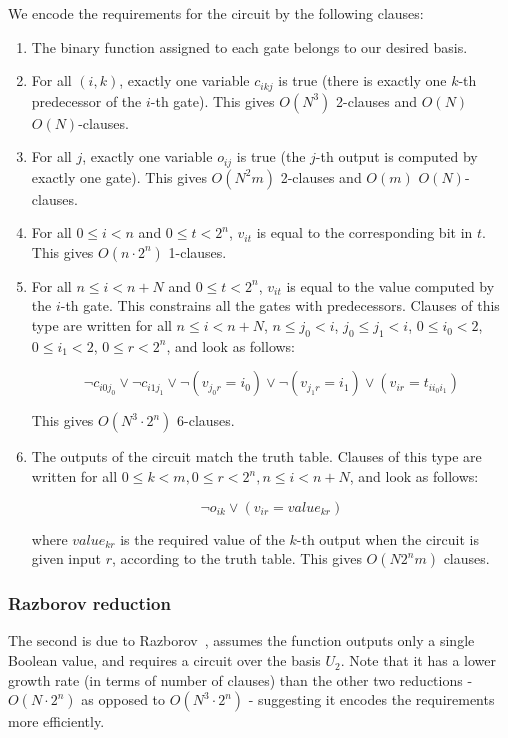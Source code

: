 \documentclass{article}
\begin{document}
We encode the requirements for the circuit by the following clauses:

\begin{enumerate}

  \item The binary function assigned to each gate belongs to our desired basis.
  \item For all $(i,k)$, exactly one variable $c_{ikj}$ is true (there is exactly one $k$-th predecessor of the $i$-th gate). This gives $O(N^3)$ 2-clauses and $O(N)$ $O(N)$-clauses.
  \item For all $j$, exactly one variable $o_{ij}$ is true (the $j$-th output is computed by exactly one gate). This gives $O(N^2m)$ 2-clauses and $O(m)$ $O(N)$-clauses.
  \item For all $0 \leq i < n$ and $0 \leq t < 2^n$, $v_{it}$ is equal to the corresponding bit in $t$. This gives $O(n \cdot 2^n)$ 1-clauses.
  \item For all $n \leq i < n + N$ and $0 \leq t < 2^n$, $v_{it}$ is equal to the value computed by the $i$-th gate. This constrains all the gates with predecessors. Clauses of this type are written for all $n \leq i < n + N$, $n \leq j_0 < i$, $j_0 \leq j_1 < i$, $0 \leq i_0 < 2$, $0 \leq i_1 < 2$, $0 \leq r < 2^n$, and look as follows: 

  \[
    \neg c_{i0j_0} \lor \neg c_{i1j_1} \lor \neg(v_{j_0r} = i_0) \lor \neg(v_{j_1r} = i_1) \lor (v_{ir} = t_{ii_0i_1})
  \]

  This gives $O(N^3 \cdot 2^n)$ 6-clauses.
  \item The outputs of the circuit match the truth table. Clauses of this type are written for all $0 \leq k < m, 0 \leq r < 2^n, n \leq i < n + N$, and look as follows:
 
  \[
    \neg o_{ik} \lor (v_{ir} = value_{kr})
  \] 

  where $value_{kr}$ is the required value of the $k$-th output when the circuit is given input $r$, according to the truth table. This gives $O(N2^nm)$ clauses.

\end{enumerate}


\subsubsection{Razborov reduction}

The second is due to Razborov~\cite{raz}, assumes the function outputs only a single Boolean value, and requires a circuit over the basis \(U_2\). Note that it has a lower growth rate (in terms of number of clauses) than the other two reductions - $O(N \cdot 2^n)$ as opposed to $O(N^3 \cdot 2^n)$ - suggesting it encodes the requirements more efficiently.
\end{document}
